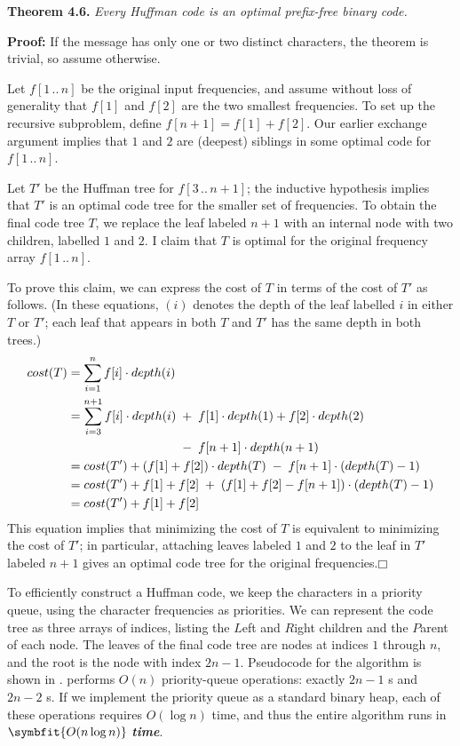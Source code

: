 \noindent\textbf{Theorem 4.6.} \textsl{Every Huffman code is an optimal prefix-free binary code.}

\noindent\textbf{Proof:} If the message has only one or two distinct characters, the theorem is trivial, so assume otherwise.

Let $f[1\,..\,n]$ be the original input frequencies, and assume without loss of generality that $f[1]$ and $f[2]$ are the two smallest frequencies.
To set up the recursive subproblem, define $f[n+1] = f[1] + f[2]$.
Our earlier exchange argument implies that $1$ and $2$ are (deepest) siblings in some optimal code for $f[1\,..\,n]$.

Let $T'$ be the Huffman tree for $f[3\,..\,n+1]$; the inductive hypothesis implies that $T'$ is an optimal code tree for the smaller set of frequencies.
To obtain the final code tree $T$, we replace the leaf labeled $n+1$ with an internal node with two children, labelled $1$ and $2$.
I claim that $T$ is optimal for the original frequency array $f[1\,..\,n]$.

To prove this claim, we can express the cost of $T$ in terms of the cost of $T'$ as follows.
(In these equations, $(i)$ denotes the depth of the leaf labelled $i$ in either $T$ or $T'$; each leaf that appears in both $T$ and $T'$ has the same depth in both trees.)
\begin{align*}
\Var{cost}(T) &= \sum_{i=1}^{n} f[i] \cdot \Var{depth}(i)\\
&= \sum_{i=3}^{n+1} f[i] \cdot \Var{depth}(i) \; + \; f[1] \cdot \Var{depth}(1) + f[2] \cdot \Var{depth}(2)\\
&\hphantom{{}= \sum_{i=3}^{n+1} f[i] \cdot \Var{depth}(i) \;} - \; f[n+1] \cdot \Var{depth}(n+1)\\
&= \Var{cost}(T') + (f[1] + f[2]) \cdot \Var{depth}(T) \; - \; f[n+1] \cdot (\Var{depth}(T) - 1)\\
&= \Var{cost}(T') + f[1] + f[2] \; + \; (f[1] + f[2] - f[n+1]) \cdot (\Var{depth}(T) - 1)\\
&= \Var{cost}(T') + f[1] + f[2]
\end{align*}
This equation implies that minimizing the cost of $T$ is equivalent to minimizing the cost of $T'$; in particular, attaching leaves labeled $1$ and $2$ to the leaf in $T'$ labeled $n+1$ gives an optimal code tree for the original frequencies.\hfill$\mdlgwhtsquare$

To efficiently construct a Huffman code, we keep the characters in a priority queue, using the character frequencies as priorities.
We can represent the code tree as three arrays of indices, listing the $L$eft and $R$ight children and the $P$arent of each node.
The leaves of the final code tree are nodes at indices $1$ through $n$, and the root is the node with index $2n-1$.
Pseudocode for the algorithm is shown in .
 performs $O(n)$ priority-queue operations: exactly $2n-1$ s and $2n-2$ s.
If we implement the priority queue as a standard binary heap, each of these operations requires $O(\log n)$ time, and thus the entire algorithm runs in $\symbfit{O(n \log n)}$ \textbf{\textit{time}}.

